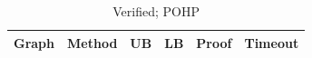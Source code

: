 \begin{table}[htbp]
\centering
\caption{Verified; POHP}
\label{tab:p2a-POHP-results}
\begin{tabular}{llllll}
\hline
Graph & Method & UB & LB & Proof & Timeout \\
\hline
\hline
\end{tabular}
\end{table}

